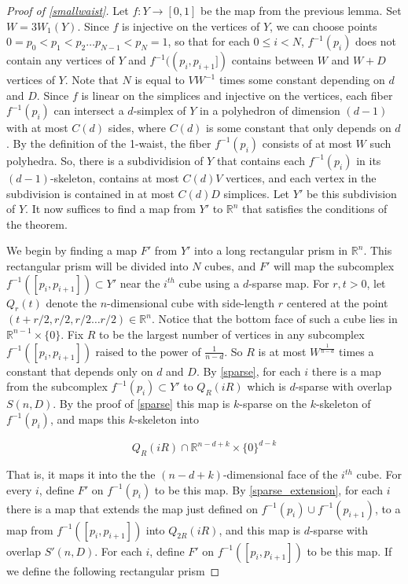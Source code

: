 \documentclass[12pt]{article}
\newcommand{\RR}{\mathbb{R}}
\begin{document}
	\begin{proof}[Proof of \cref{smallwaist}] Let $f: Y \to [0,1]$ be the map from the previous lemma. Set $W = 3W_1(Y)$. Since $f$ is injective on the vertices of $Y$, we can choose points $0 = p_0  < p_1 < p_2 \ldots p_{N-1} < p_N=1$, so that for each $0 \le i < N$, $f^{-1}(p_i)$ does not contain any vertices of $Y$ and $f^{-1}((p_i, p_{i+1}])$ contains between $W$ and $W+D$ vertices of $Y$. Note that $N$ is equal to $VW^{-1}$ times some constant depending on $d$ and $D$. Since $f$ is linear on the simplices and injective on the vertices, each fiber $f^{-1}(p_i)$ can intersect a $d$-simplex of $Y$ in a polyhedron of dimension $(d-1)$ with at most $C(d)$ sides, where $C(d)$ is some constant that only depends on $d$. By the definition of the 1-waist, the fiber $f^{-1}(p_i)$ consists of at most $W$ such polyhedra. So, there is a subdividision of $Y$ that contains each $f^{-1}(p_i)$ in its $(d-1)$-skeleton, contains at most $C(d)V$ vertices, and each vertex in the subdivision is contained in at most $C(d)D$ simplices. Let $Y'$ be this subdivision of $Y$. It now suffices to find a map from $Y'$ to $\RR^n$ that satisfies the conditions of the theorem. 
		
		We begin by finding a map $F'$ from $Y'$ into a long rectangular prism in $\RR^n$. This rectangular prism will be divided into $N$ cubes, and $F'$ will map the subcomplex  $f^{-1}([p_i, p_{i+1}]) \subset Y'$ near the $i^{th}$ cube using a $d$-sparse map. For $r,t>0$, let $Q_r(t)$ denote the $n$-dimensional cube with side-length $r$ centered at the point $(t+r/2, r/2, r/2 \ldots r/2) \in \RR^n$. Notice that the bottom face of such a cube lies in $\RR^{n-1} \times \{0\}$. Fix $R$ to be the largest number of vertices in any subcomplex $f^{-1}([p_i, p_{i+1}])$ raised to the power of $\frac{1}{n-d}$. So $R$ is at most $W^{\frac{1}{n-d}}$ times a constant that depends only on $d$ and $D$. By \cref{sparse}, for each $i$ there is a map from the subcomplex $f^{-1}(p_i) \subset Y'$ to $Q_{R}(iR)$ which is $d$-sparse with overlap $S(n,D)$. By the proof of \cref{sparse} this map is $k$-sparse on the $k$-skeleton of $f^{-1}(p_i)$, and maps this $k$-skeleton into 
		
		$$Q_{R}(iR) \cap \RR^{n-d+k} \times \{0\}^{d-k}$$
		
		That is, it maps it into the the $(n-d+k)$-dimensional face of the $i^{th}$ cube. For every $i$, define $F'$ on $f^{-1}(p_i)$ to be this map. By \cref{sparse_extension}, for each $i$ there is a map that extends the map just defined on $f^{-1}(p_i) \cup f^{-1}(p_{i+1})$, to a map from $f^{-1}([p_i, p_{i+1}])$ into $Q_{2R}(iR)$, and this map is $d$-sparse with overlap $S'(n,D)$. For each $i$, define $F'$ on $f^{-1}([p_i, p_{i+1}])$ to be this map. If we define the following rectangular prism
		

\end{proof}
\end{document}
